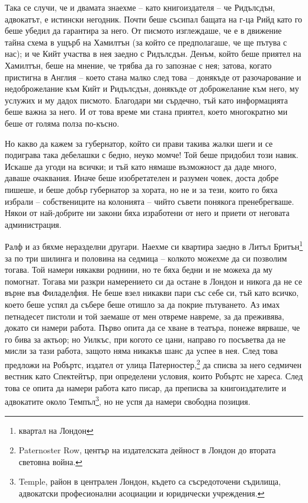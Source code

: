 \documentclass[12pt]{book}
\begin{document}
Така се случи, че и двамата знаехме – като книгоиздателя – че Ридълсдън, адвокатът, е истински негодник. Почти беше съсипал бащата на г-ца Рийд като го беше убедил да гарантира за него. От писмото изглеждаше, че е в движение тайна схема в ущърб на Хамилтън (за който се предполагаше, че ще пътува с нас); и че Кийт участва в нея заедно с Ридълсдън. Денъм, който беше приятел на Хамилтън, беше на мнение, че трябва да го запознае с нея; затова, когато пристигна в Англия – което стана малко след това – донякъде от разочарование и недоброжелание към Кийт и Ридълсдън, донякъде от доброжелание към него, му услужих и му дадох писмото. Благодари ми сърдечно, тъй като информацията беше важна за него. И от това време ми стана приятел, което многократно ми беше от голяма полза по-късно.

Но какво да кажем за губернатор, който си прави такива жалки шеги и се подиграва така дебелашки с бедно, неуко момче! Той беше придобил този навик. Искаше да угоди на всички; и тъй като нямаше възможност да даде много, даваше очаквания. Иначе беше изобретателен и разумен човек, доста добре пишеше, и беше добър губернатор за хората, но не и за тези, които го бяха избрали – собствениците на колонията – чийто съвети понякога пренебрегваше. Някои от най-добрите ни закони бяха изработени от него и приети от неговата администрация. 

Ралф и аз бяхме неразделни другари. Наехме си квартира заедно в Литъл Бритън\footnote{квартал на Лондон} за по три шилинга и половина на седмица – колкото можехме да си позволим тогава. Той намери някакви роднини, но те бяха бедни и не можеха да му помогнат. Тогава ми разкри намерението си да остане в Лондон и никога да не се върне във Филаделфия. Не беше взел никакви пари със себе си, тъй като всичко, което беше успял да събере беше отишло за да покрие пътуването. Аз имах петнадесет пистоли и той заемаше от мен отвреме навреме, за да преживява, докато си намери работа. Първо опита да се хване в театъра, понеже вярваше, че го бива за актьор; но Уилкъс, при когото се цани, направо го посъветва да не мисли за тази работа, защото няма никакъв шанс да успее в нея. След това предложи на Робъртс, издател от улица Патерностер,\footnote{Paternoster Row, център на издателската дейност в Лондон до втората световна война.} да списва за него седмичен вестник като Спектейтър, при определени условия, които Робъртс не хареса. След това се опита да намери работа като писар, да преписва за книгоиздателите и адвокатите около Темпъл\footnote{Temple, район в централен Лондон, където са съсредоточени съдилища, адвокатски професионални асоциации и юридически учреждения.}, но не успя да намери свободна позиция. 
\end{document}
